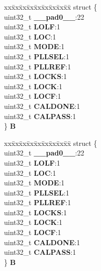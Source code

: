 \begin{DoxyCompactItemize}
\begin{tabbing}
\end{tabbing}\item 
\mbox{\label{unionFMPLL__tag_1_1FMPLL__SYNSR__tag_a5e57a30edfef0e77a436f252aeb9da83}} 
\begin{tabbing}
xx\=xx\=xx\=xx\=xx\=xx\=xx\=xx\=xx\=\kill
struct \{\\
\>uint32\_t {\bfseries \_\_pad0\_\_}:22\\
\>uint32\_t {\bfseries LOLF}:1\\
\>uint32\_t {\bfseries LOC}:1\\
\>uint32\_t {\bfseries MODE}:1\\
\>uint32\_t {\bfseries PLLSEL}:1\\
\>uint32\_t {\bfseries PLLREF}:1\\
\>uint32\_t {\bfseries LOCKS}:1\\
\>uint32\_t {\bfseries LOCK}:1\\
\>uint32\_t {\bfseries LOCF}:1\\
\>uint32\_t {\bfseries CALDONE}:1\\
\>uint32\_t {\bfseries CALPASS}:1\\
\} {\bfseries B}\\

\end{tabbing}\item 
\mbox{\label{unionFMPLL__tag_1_1FMPLL__SYNSR__tag_aa5ca29e5eece751119eb8a96d6474399}} 
\begin{tabbing}
xx\=xx\=xx\=xx\=xx\=xx\=xx\=xx\=xx\=\kill
struct \{\\
\>uint32\_t {\bfseries \_\_pad0\_\_}:22\\
\>uint32\_t {\bfseries LOLF}:1\\
\>uint32\_t {\bfseries LOC}:1\\
\>uint32\_t {\bfseries MODE}:1\\
\>uint32\_t {\bfseries PLLSEL}:1\\
\>uint32\_t {\bfseries PLLREF}:1\\
\>uint32\_t {\bfseries LOCKS}:1\\
\>uint32\_t {\bfseries LOCK}:1\\
\>uint32\_t {\bfseries LOCF}:1\\
\>uint32\_t {\bfseries CALDONE}:1\\
\>uint32\_t {\bfseries CALPASS}:1\\
\} {\bfseries B}\\


\end{tabbing}
\end{DoxyCompactItemize}
